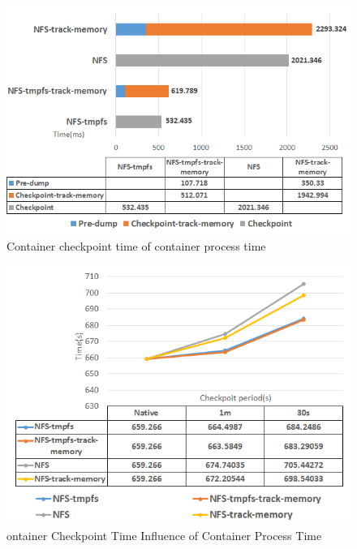 \begin{figure}[hbtp]
\begin{center}
\includegraphics[width=14cm]{figure/cpu_checkpoint_time.png}
\end{center}
\caption{Container checkpoint time of container process time}
\label{fig:Checkpoint Time CPU}
\end{figure}

\begin{figure}[hbtp]
\begin{center}
\includegraphics[width=14cm]{figure/cpu_checkpoint_period.png}
\end{center}
\caption{ontainer Checkpoint Time Influence of Container Process Time}
\label{fig:Checkpoint Time Influence CPU}
\end{figure}

